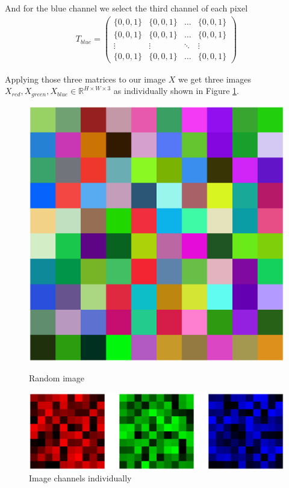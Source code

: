 And for the blue channel we select the third channel of each pixel
\begin{align}
  T_{blue} = \begin{pmatrix}
    \{0, 0, 1\}
    & \{0, 0, 1\}
    & \dots
    & \{0, 0, 1\}\\
    \{0, 0, 1\}
    & \{0, 0, 1\}
    & \dots
    & \{0, 0, 1\}\\
    \vdots & \vdots & \ddots & \vdots \\
    \{0, 0, 1\}
    & \{0, 0, 1\}
    & \dots
    & \{0, 0, 1\}
  \end{pmatrix}
\end{align}

Applying those three matrices to our image $X$ we get three images $X_{red}, X_{green}, X_{blue} \in \mathbb{R}^{H \times W \times 3}$ as individually shown in Figure \ref{fig:channels-individual}.
\begin{figure}
  \centering
\begin{minipage}[t]{.3\textwidth}
  \includegraphics[width=.95\textwidth]{images/FE_img_rng_image.eps}
  \caption{Random image}
  \label{fig:channels}
\end{minipage}
\begin{minipage}[t]{.6\textwidth}
  \includegraphics[width=.95\textwidth]{images/FE_img_channels.eps}
  \caption{Image channels individually}
  \label{fig:channels-individual}
\end{minipage}
\end{figure}

